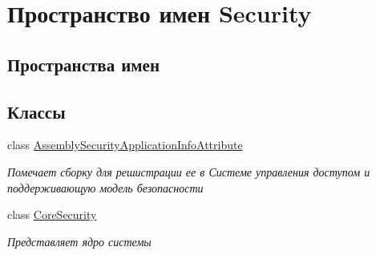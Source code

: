 \hypertarget{namespace_security}{}\section{Пространство имен Security}
\label{namespace_security}
\subsection*{Пространства имен}
\begin{DoxyCompactItemize}
\end{DoxyCompactItemize}
\subsection*{Классы}
\begin{DoxyCompactItemize}
\item 
class \hyperlink{class_security_1_1_assembly_security_application_info_attribute}{Assembly\+Security\+Application\+Info\+Attribute}
\begin{DoxyCompactList}\small\item\em Помечает сборку для решистрации ее в Системе управления доступом и поддерживающую модель безопасности \end{DoxyCompactList}\item 
class \hyperlink{class_security_1_1_core_security}{Core\+Security}
\begin{DoxyCompactList}\small\item\em Представляет ядро системы \end{DoxyCompactList}\end{DoxyCompactItemize}
